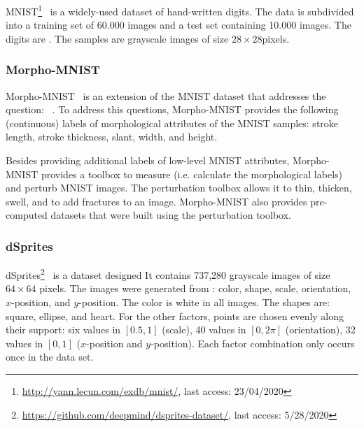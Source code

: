 MNIST\footnote{\href{http://yann.lecun.com/exdb/mnist/}{http://yann.lecun.com/exdb/mnist/}, last access: 23/04/2020}~\citep{lecun1998gradient} is a widely-used dataset of hand-written digits.
The data is subdivided into a training set of 60.000 images and a test set containing 10.000 images.
The digits are .
The samples are grayscale images of size $28\times 28$pixels.

\subsubsection{Morpho-MNIST}\label{subsubsec:morphomnist}

Morpho-MNIST~\citep{castro2019morpho} is an extension of the MNIST dataset that addresses the question:  ~\citep{castro2019morpho}.
To address this questions, Morpho-MNIST provides the following (continuous) labels of morphological attributes of the MNIST samples: stroke length, stroke thickness, slant, width, and height.

Besides providing additional labels of low-level MNIST attributes, Morpho-MNIST provides a toolbox to measure (i.e. calculate the morphological labels) and perturb MNIST images.
The perturbation toolbox allows it to thin, thicken, swell, and to add fractures to an image.
Morpho-MNIST also provides pre-computed datasets that were built using the perturbation toolbox.

\subsubsection{dSprites}
dSprites\footnote{\href{https://github.com/deepmind/dsprites-dataset/}{https://github.com/deepmind/dsprites-dataset/}, last access: 5/28/2020}~\citep{dsprites17} is a dataset designed 
It contains 737,280 grayscale images of size $64\times 64$ pixels.
The images were generated from : color, shape, scale, orientation, $x$-position, and $y$-position.
The color is white in all images.
The shapes are: square, ellipse, and heart.
For the other factors, points are chosen evenly along their support: six values in $[0.5, 1]$ (scale), 40 values in $[0, 2\pi]$ (orientation), 32 values in $[0, 1]$ ($x$-position and $y$-position).
Each factor combination only occurs once in the data set.

